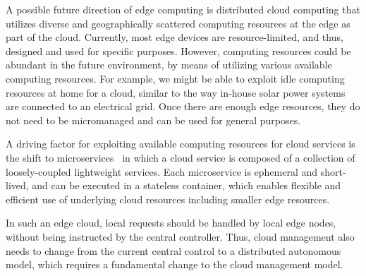
A possible future direction of edge computing is distributed cloud
computing that utilizes diverse and geographically scattered computing
resources at the edge as part of the cloud.
Currently, most edge devices are resource-limited, and thus, designed
and used for specific purposes.
However, computing resources could be abundant in the future environment,
by means of utilizing various available computing resources.
For example, we might be able to exploit idle computing resources at
home for a cloud, similar to the way in-house solar power systems are
connected to an electrical grid.
Once there are enough edge resources, they do not need to be
micromanaged and can be used for general purposes.

A driving factor for exploiting available computing resources for cloud
services is the shift to microservices~\cite{nadareishvili2016microservice}
in which a cloud service is composed of a collection of loosely-coupled
lightweight services.
Each microservice is ephemeral and short-lived, and can be executed
in a stateless container,
which enables flexible and efficient use of underlying cloud
resources including smaller edge resources.

In such an edge cloud, local requests should be handled by local edge
nodes, without being instructed by the central controller.
Thus, cloud management also needs to change from the current central
control to a distributed autonomous model, which requires a
fundamental change to the cloud management model.


